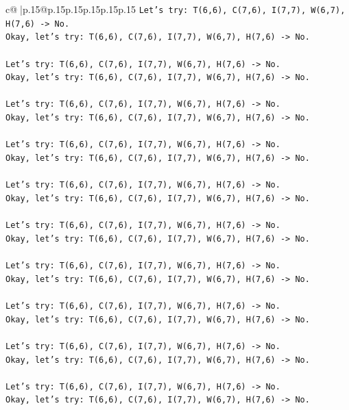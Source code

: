 \documentclass{article}
\begin{document}
{\begin{supertabular}{c@{$\;$}|p{.15\linewidth}@{}p{.15\linewidth}p{.15\linewidth}p{.15\linewidth}p{.15\linewidth}p{.15\linewidth}}
{{{\texttt{Let's try: T(6,6), C(7,6), I(7,7), W(6,7), H(7,6) {-}> No.} \\
\texttt{Okay, let's try: T(6,6), C(7,6), I(7,7), W(6,7), H(7,6) {-}> No.} \\
\\ 
\texttt{Let's try: T(6,6), C(7,6), I(7,7), W(6,7), H(7,6) {-}> No.} \\
\texttt{Okay, let's try: T(6,6), C(7,6), I(7,7), W(6,7), H(7,6) {-}> No.} \\
\\ 
\texttt{Let's try: T(6,6), C(7,6), I(7,7), W(6,7), H(7,6) {-}> No.} \\
\texttt{Okay, let's try: T(6,6), C(7,6), I(7,7), W(6,7), H(7,6) {-}> No.} \\
\\ 
\texttt{Let's try: T(6,6), C(7,6), I(7,7), W(6,7), H(7,6) {-}> No.} \\
\texttt{Okay, let's try: T(6,6), C(7,6), I(7,7), W(6,7), H(7,6) {-}> No.} \\
\\ 
\texttt{Let's try: T(6,6), C(7,6), I(7,7), W(6,7), H(7,6) {-}> No.} \\
\texttt{Okay, let's try: T(6,6), C(7,6), I(7,7), W(6,7), H(7,6) {-}> No.} \\
\\ 
\texttt{Let's try: T(6,6), C(7,6), I(7,7), W(6,7), H(7,6) {-}> No.} \\
\texttt{Okay, let's try: T(6,6), C(7,6), I(7,7), W(6,7), H(7,6) {-}> No.} \\
\\ 
\texttt{Let's try: T(6,6), C(7,6), I(7,7), W(6,7), H(7,6) {-}> No.} \\
\texttt{Okay, let's try: T(6,6), C(7,6), I(7,7), W(6,7), H(7,6) {-}> No.} \\
\\ 
\texttt{Let's try: T(6,6), C(7,6), I(7,7), W(6,7), H(7,6) {-}> No.} \\
\texttt{Okay, let's try: T(6,6), C(7,6), I(7,7), W(6,7), H(7,6) {-}> No.} \\
\\ 
\texttt{Let's try: T(6,6), C(7,6), I(7,7), W(6,7), H(7,6) {-}> No.} \\
\texttt{Okay, let's try: T(6,6), C(7,6), I(7,7), W(6,7), H(7,6) {-}> No.} \\
\\ 
\texttt{Let's try: T(6,6), C(7,6), I(7,7), W(6,7), H(7,6) {-}> No.} \\
\texttt{Okay, let's try: T(6,6), C(7,6), I(7,7), W(6,7), H(7,6) {-}> No.} \\
}}}
\end{supertabular}}
\end{document}

